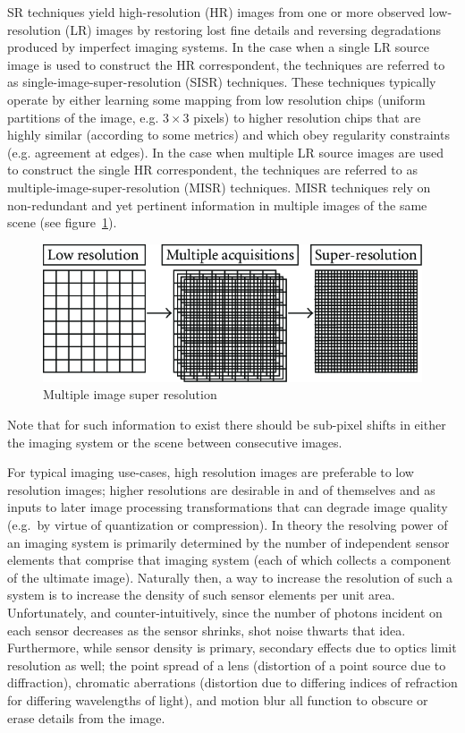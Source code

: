 SR techniques yield high-resolution (HR) images from one or more observed low-resolution (LR) images by restoring lost fine details and reversing degradations produced by imperfect imaging systems.
%
In the case when a single LR source image is used to construct the HR correspondent, the techniques are referred to as single-image-super-resolution (SISR) techniques.
%
These techniques typically operate by either learning some mapping from low resolution chips (uniform partitions of the image, e.g. $3\times 3$ pixels) to higher resolution chips that are highly similar (according to some metrics) and which obey regularity constraints (e.g. agreement at edges).
%
In the case when multiple LR source images are used to construct the single HR correspondent, the techniques are referred to as multiple-image-super-resolution (MISR) techniques.
%
MISR techniques rely on non-redundant and yet pertinent information in multiple images of the same scene (see figure~\ref{fig:misr}).
\begin{figure}
    \includegraphics[width=\linewidth,keepaspectratio]{figures/misr.png}
    \caption{Multiple image super resolution\cite{misr}}
    \label{fig:misr}
\end{figure}
%
Note that for such information to exist there should be sub-pixel shifts in either the imaging system or the scene between consecutive images.


For typical imaging use-cases, high resolution images are preferable to low resolution images; higher resolutions are
desirable in and of themselves and as inputs to later image processing transformations that can degrade image quality (e.g.\ by virtue of quantization or compression).
%
In theory the resolving power of an imaging system is primarily determined by the number of independent sensor elements that comprise that imaging system (each of which collects a component of the ultimate image).
%
Naturally then, a way to increase the resolution of such a system is to increase the density of such sensor elements per unit area.
%
Unfortunately, and counter-intuitively, since the number of photons incident on each sensor decreases as the sensor shrinks, shot noise thwarts that idea.
%
Furthermore, while sensor density is primary, secondary effects due to optics limit resolution as well;
the point spread of a lens (distortion of a point source due to diffraction), chromatic aberrations (distortion due to differing indices of refraction for differing wavelengths of light), and motion blur all function to obscure or erase details from the image.


